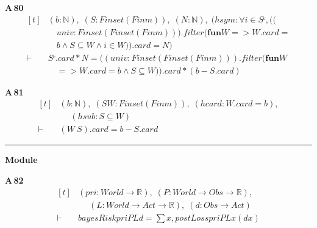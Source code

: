 \noindent\textbf{A\,80}\quad{}
{\footnotesize\[ \begin{aligned}[t]
&(\mathit{b} : \mathbb{N} ),\; (\mathit{S} : \mathit{Finset} (\mathit{Fin} \mathit{m})),\; (\mathit{N} : \mathbb{N} ),\; (\mathit{hsym} : \forall \mathit{i} \in \mathit{Sᶜ}, ((\\
&\quad \mathit{univ} : \mathit{Finset} (\mathit{Finset} (\mathit{Fin} \mathit{m}))).\mathit{filter} (\mathbf{fun} \mathit{W} => \mathit{W}.\mathit{card} =\\
&\quad \mathit{b} \wedge \mathit{S} \subseteq \mathit{W} \wedge \mathit{i} \in \mathit{W})).\mathit{card} = \mathit{N})\\
\vdash\;&\mathit{Sᶜ}.\mathit{card} * \mathit{N} = ((\mathit{univ} : \mathit{Finset} (\mathit{Finset} (\mathit{Fin} \mathit{m}))).\mathit{filter} (\mathbf{fun} \mathit{W}\\
&\quad => \mathit{W}.\mathit{card} = \mathit{b} \wedge \mathit{S} \subseteq \mathit{W})).\mathit{card} * (\mathit{b} - \mathit{S}.\mathit{card})
\end{aligned} \]}

\noindent\textbf{A\,81}\quad{}
{\footnotesize\[ \begin{aligned}[t]
&(\mathit{b} : \mathbb{N} ),\; (\mathit{S} \mathit{W} : \mathit{Finset} (\mathit{Fin} \mathit{m})),\; (\mathit{hcard} : \mathit{W}.\mathit{card} = \mathit{b}),\\
&\quad \; (\mathit{hsub} : \mathit{S} \subseteq \mathit{W})\\
\vdash\;&(\mathit{W} \ \mathit{S}).\mathit{card} = \mathit{b} - \mathit{S}.\mathit{card}
\end{aligned} \]}

\vspace{4pt}\noindent\rule{\columnwidth}{0.4pt}\par\vspace{2pt}
\noindent\textbf{Module }\par\vspace{3pt}

\noindent\textbf{A\,82}\quad{}
{\footnotesize\[ \begin{aligned}[t]
&(\mathit{pri} : \mathit{World} \to \mathbb{R} ),\; (\mathit{P} : \mathit{World} \to \mathit{Obs} \to \mathbb{R} ),\\
&\quad \; (\mathit{L} : \mathit{World} \to \mathit{Act} \to \mathbb{R} ),\; (\mathit{d} : \mathit{Obs} \to \mathit{Act})\\
\vdash\;&\mathit{bayesRisk} \mathit{pri} \mathit{P} \mathit{L} \mathit{d} = \textstyle\sum \mathit{x}, \mathit{postLoss} \mathit{pri} \mathit{P} \mathit{L} \mathit{x} (\mathit{d} \mathit{x})
\end{aligned} \]}

